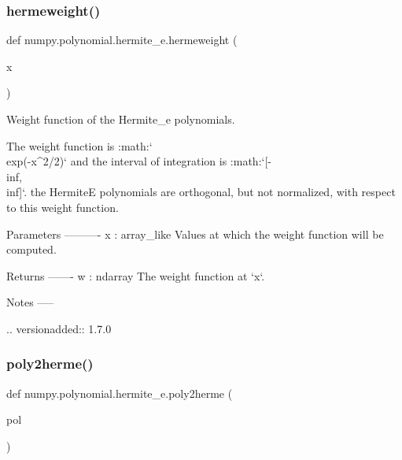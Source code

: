 \subsubsection{\texorpdfstring{hermeweight()}{hermeweight()}}
{\footnotesize\ttfamily def numpy.\+polynomial.\+hermite\+\_\+e.\+hermeweight (\begin{DoxyParamCaption}\item[{}]{x }\end{DoxyParamCaption})}

\begin{DoxyVerb}Weight function of the Hermite_e polynomials.

The weight function is :math:`\\exp(-x^2/2)` and the interval of
integration is :math:`[-\\inf, \\inf]`. the HermiteE polynomials are
orthogonal, but not normalized, with respect to this weight function.

Parameters
----------
x : array_like
   Values at which the weight function will be computed.

Returns
-------
w : ndarray
   The weight function at `x`.

Notes
-----

.. versionadded:: 1.7.0\end{DoxyVerb}
 \mbox{\label{namespacenumpy_1_1polynomial_1_1hermite__e_ac177ab24e638db759def7dd2ff5c6b27}} 
\subsubsection{\texorpdfstring{poly2herme()}{poly2herme()}}
{\footnotesize\ttfamily def numpy.\+polynomial.\+hermite\+\_\+e.\+poly2herme (\begin{DoxyParamCaption}\item[{}]{pol }\end{DoxyParamCaption})}

